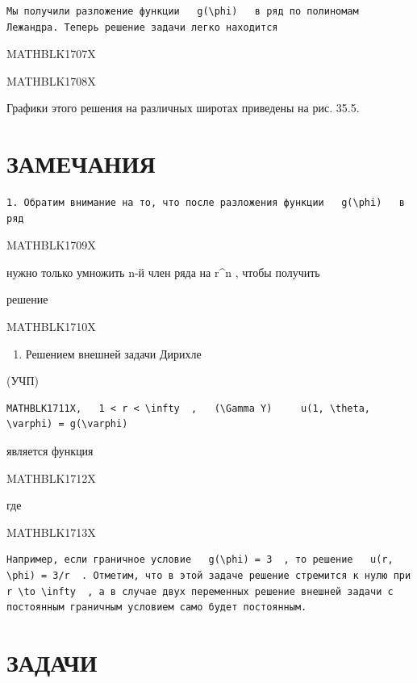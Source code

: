 \documentclass[
]{article}
\providecommand{\tightlist}{%
  \setlength{\itemsep}{0pt}\setlength{\parskip}{0pt}}
\begin{document}
{{{\begin{verbatim}
Мы получили разложение функции   g(\phi)   в ряд по полиномам Лежандра. Теперь решение задачи легко находится
\end{verbatim}

MATHBLK1707X

MATHBLK1708X

Графики этого решения на различных широтах приведены на рис. 35.5.

\section{ЗАМЕЧАНИЯ}\label{ux437ux430ux43cux435ux447ux430ux43dux438ux44f-14}

\begin{verbatim}
1. Обратим внимание на то, что после разложения функции   g(\phi)   в ряд
\end{verbatim}

MATHBLK1709X

нужно только умножить n-й член ряда на r\^{}n , чтобы получить

решение

MATHBLK1710X

\begin{enumerate}
\def\labelenumi{\arabic{enumi}.}
\setcounter{enumi}{1}
\tightlist
\item
  Решением внешней задачи Дирихле
\end{enumerate}

(УЧП)

\begin{verbatim}
MATHBLK1711X,   1 < r < \infty  ,   (\Gamma Y)     u(1, \theta, \varphi) = g(\varphi)
\end{verbatim}

является функция

MATHBLK1712X

где

MATHBLK1713X

\begin{verbatim}
Например, если граничное условие   g(\phi) = 3  , то решение   u(r, \phi) = 3/r  . Отметим, что в этой задаче решение стремится к нулю при   r \to \infty  , а в случае двух переменных решение внешней задачи с постоянным граничным условием само будет постоянным.
\end{verbatim}

\section{ЗАДАЧИ}\label{ux437ux430ux434ux430ux447ux438-14}

}}}
\end{document}
